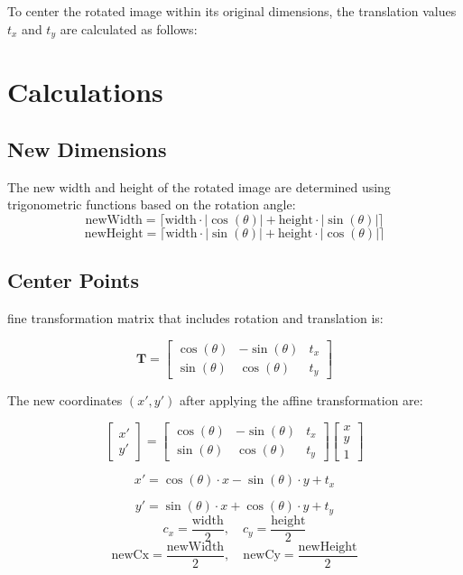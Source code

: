 \documentclass[conference]{IEEEtran}
\begin{document}
To center the rotated image within its original dimensions, the translation values \(t_x\) and \(t_y\) are calculated as follows:

\section*{Calculations}

\subsection*{New Dimensions}
The new width and height of the rotated image are determined using trigonometric functions based on the rotation angle:
\[
\text{newWidth} = \lceil \text{width} \cdot |\cos(\theta)| + \text{height} \cdot |\sin(\theta)| \rceil
\]
\[
\text{newHeight} = \lceil \text{width} \cdot |\sin(\theta)| + \text{height} \cdot |\cos(\theta)| \rceil
\]

\subsection*{Center Points}fine transformation matrix that includes rotation and translation is:

\[
\mathbf{T} = \begin{bmatrix}
\cos(\theta) & -\sin(\theta) & t_x \\
\sin(\theta) & \cos(\theta) & t_y
\end{bmatrix}
\]

The new coordinates \((x', y')\) after applying the affine transformation are:

\[
\begin{bmatrix}
x' \\
y'
\end{bmatrix}
=
\begin{bmatrix}
\cos(\theta) & -\sin(\theta) & t_x \\
\sin(\theta) & \cos(\theta) & t_y
\end{bmatrix}
\begin{bmatrix}
x \\
y \\
1
\end{bmatrix}
\]

\[
x' = \cos(\theta) \cdot x - \sin(\theta) \cdot y + t_x
\]

\[
y' = \sin(\theta) \cdot x + \cos(\theta) \cdot y + t_y
\]
\[
c_x = \frac{\text{width}}{2}, \quad c_y = \frac{\text{height}}{2}
\]
\[
\text{newCx} = \frac{\text{newWidth}}{2}, \quad \text{newCy} = \frac{\text{newHeight}}{2}
\]
\end{document}
